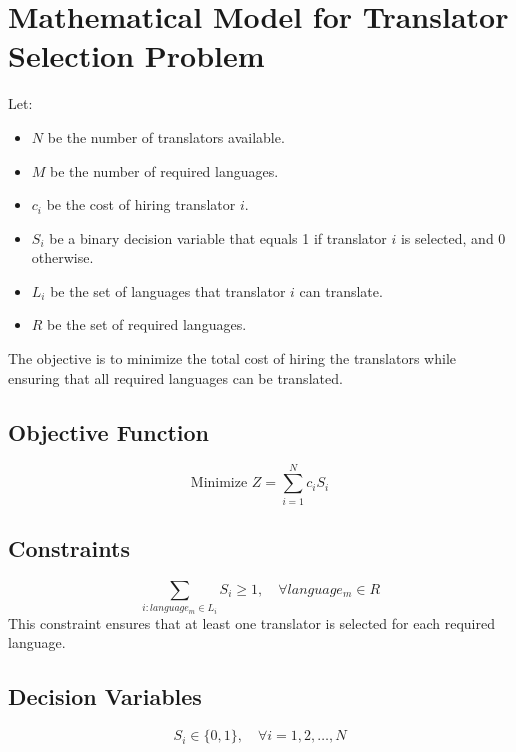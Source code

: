 \documentclass{article}
\begin{document}
\section*{Mathematical Model for Translator Selection Problem}

Let:
\begin{itemize}
    \item \( N \) be the number of translators available.
    \item \( M \) be the number of required languages.
    \item \( c_i \) be the cost of hiring translator \( i \).
    \item \( S_i \) be a binary decision variable that equals 1 if translator \( i \) is selected, and 0 otherwise.
    \item \( L_i \) be the set of languages that translator \( i \) can translate.
    \item \( R \) be the set of required languages.
\end{itemize}

The objective is to minimize the total cost of hiring the translators while ensuring that all required languages can be translated.

\subsection*{Objective Function}
\[
\text{Minimize } Z = \sum_{i=1}^{N} c_i S_i
\]

\subsection*{Constraints}
\[
\sum_{i: language_m \in L_i} S_i \geq 1, \quad \forall language_m \in R
\]
This constraint ensures that at least one translator is selected for each required language.

\subsection*{Decision Variables}
\[
S_i \in \{0, 1\}, \quad \forall i = 1, 2, \ldots, N
\]
\end{document}
